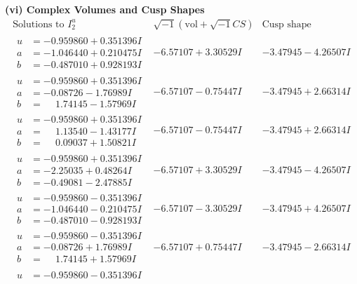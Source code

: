 \documentclass[1p]{elsarticle_modified}
\theoremstyle{definition}
\newcommand{\I}{\sqrt{-1}}
\begin{document}
\newpage\flushleft \textbf{(vi) Complex Volumes and Cusp Shapes}
$$\begin{array}{c|c|c}  
\text{Solutions to }I^u_{2}& \I (\text{vol} + \sqrt{-1}CS) & \text{Cusp shape}\\
 \hline 
\begin{aligned}
u &= -0.959860 + 0.351396 I \\
a &= -1.046440 + 0.210475 I \\
b &= -0.487010 + 0.928193 I\end{aligned}
 & -6.57107 + 3.30529 I & -3.47945 - 4.26507 I \\ \hline\begin{aligned}
u &= -0.959860 + 0.351396 I \\
a &= -0.08726 - 1.76989 I \\
b &= \phantom{-}1.74145 - 1.57969 I\end{aligned}
 & -6.57107 - 0.75447 I & -3.47945 + 2.66314 I \\ \hline\begin{aligned}
u &= -0.959860 + 0.351396 I \\
a &= \phantom{-}1.13540 - 1.43177 I \\
b &= \phantom{-}0.09037 + 1.50821 I\end{aligned}
 & -6.57107 - 0.75447 I & -3.47945 + 2.66314 I \\ \hline\begin{aligned}
u &= -0.959860 + 0.351396 I \\
a &= -2.25035 + 0.48264 I \\
b &= -0.49081 - 2.47885 I\end{aligned}
 & -6.57107 + 3.30529 I & -3.47945 - 4.26507 I \\ \hline\begin{aligned}
u &= -0.959860 - 0.351396 I \\
a &= -1.046440 - 0.210475 I \\
b &= -0.487010 - 0.928193 I\end{aligned}
 & -6.57107 - 3.30529 I & -3.47945 + 4.26507 I \\ \hline\begin{aligned}
u &= -0.959860 - 0.351396 I \\
a &= -0.08726 + 1.76989 I \\
b &= \phantom{-}1.74145 + 1.57969 I\end{aligned}
 & -6.57107 + 0.75447 I & -3.47945 - 2.66314 I \\ \hline\begin{aligned}
u &= -0.959860 - 0.351396 I \\

\end{aligned}
\end{array}$$
\end{document}
